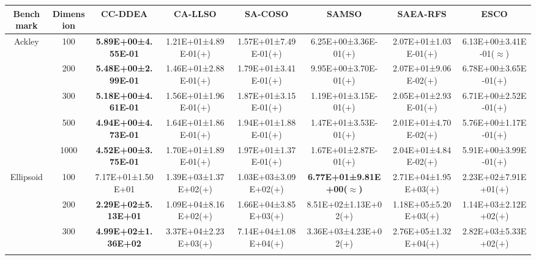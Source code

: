 \begin{tabular}{|cc|c|c|c|c|c|c|}
\hline
\multicolumn{1}{|c|}{Benchmark}                   & Dimension & CC-DDEA                    & CA-LLSO                & SA-COSO                & SAMSO                                 & SAEA-RFS               & ESCO                            \\ \hline
\multicolumn{1}{|c|}{\multirow{5}{*}{Ackley}}     & 100       & \textbf{5.89E+00±4.55E-01} & 1.21E+01±4.89E-01($+$) & 1.57E+01±7.49E-01($+$) & 6.25E+00±3.36E-01($+$)                & 2.07E+01±1.03E-01($+$) & 6.13E+00±3.41E-01($\approx$)    \\ \cline{2-8} 
\multicolumn{1}{|c|}{}                            & 200       & \textbf{5.48E+00±2.99E-01} & 1.46E+01±2.88E-01($+$) & 1.79E+01±3.41E-01($+$) & 9.95E+00±3.70E-01($+$)                & 2.07E+01±9.06E-02($+$) & 6.78E+00±3.65E-01($+$)          \\ \cline{2-8} 
\multicolumn{1}{|c|}{}                            & 300       & \textbf{5.18E+00±4.61E-01} & 1.56E+01±1.96E-01($+$) & 1.87E+01±3.15E-01($+$) & 1.19E+01±3.15E-01($+$)                & 2.05E+01±2.93E-01($+$) & 6.71E+00±2.52E-01($+$)          \\ \cline{2-8} 
\multicolumn{1}{|c|}{}                            & 500       & \textbf{4.94E+00±4.73E-01} & 1.64E+01±1.86E-01($+$) & 1.94E+01±1.88E-01($+$) & 1.47E+01±3.53E-01($+$)                & 2.01E+01±4.70E-02($+$) & 5.76E+00±1.17E-01($+$)          \\ \cline{2-8} 
\multicolumn{1}{|c|}{}                            & 1000      & \textbf{4.52E+00±3.75E-01} & 1.70E+01±1.89E-01($+$) & 1.97E+01±1.37E-01($+$) & 1.67E+01±2.87E-01($+$)                & 2.04E+01±4.84E-02($+$) & 5.91E+00±3.99E-01($+$)          \\ \hline
\multicolumn{1}{|c|}{\multirow{5}{*}{Ellipsoid}}  & 100       & 7.17E+01±1.50E+01          & 1.39E+03±1.37E+02($+$) & 1.03E+03±3.09E+02($+$) & \textbf{6.77E+01±9.81E+00($\approx$)} & 2.71E+04±1.95E+03($+$) & 2.23E+02±7.91E+01($+$)          \\ \cline{2-8} 
\multicolumn{1}{|c|}{}                            & 200       & \textbf{2.29E+02±5.13E+01} & 1.09E+04±8.16E+02($+$) & 1.66E+04±3.85E+03($+$) & 8.51E+02±1.13E+02($+$)                & 1.18E+05±5.20E+03($+$) & 1.14E+03±2.12E+02($+$)          \\ \cline{2-8} 
\multicolumn{1}{|c|}{}                            & 300       & \textbf{4.99E+02±1.36E+02} & 3.37E+04±2.23E+03($+$) & 7.14E+04±1.08E+04($+$) & 3.36E+03±4.23E+02($+$)                & 2.76E+05±1.32E+04($+$) & 2.82E+03±5.33E+02($+$)          \\ \cline{2-8} 

\end{tabular}
